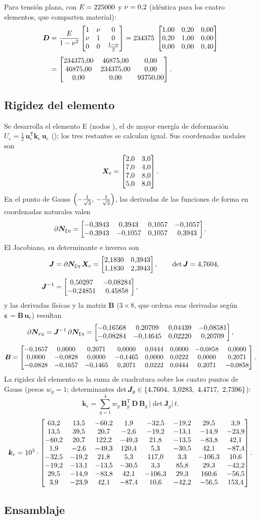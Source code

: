 Para tensión plana, con $E=\valE$ y $\nu=\valNu$ (idéntica para los cuatro elementos, que comparten material):
\begin{align*}
\bm{D}&=\frac{E}{1-\nu^{2}}
\begin{bmatrix} 1 & \nu & 0 \\ \nu & 1 & 0 \\ 0 & 0 & \tfrac{1-\nu}{2} \end{bmatrix}
=\valDfactor\;\DmatNorm \\[0.4em]
&=\Dmat .
\end{align*}

\subsection{Rigidez del elemento}

Se desarrolla el elemento E\showId{} (nodos \showNodes), el de mayor energía de deformación $U_e=\tfrac12\,\bm{u}_e^{\mathsf{T}}\bm{k}_e\,\bm{u}_e$ (\energiaInline); los tres restantes se calculan igual. Sus coordenadas nodales son
\[
\bm{X}_e=\Xemat .
\]
En el punto de Gauss $\gpA$, las derivadas de las funciones de forma en coordenadas naturales valen
\[
\partial\bm{N}_{\xi\eta}=\dNnatA .
\]
El Jacobiano, su determinante e inversa son
\begin{align*}
\bm{J}&=\partial\bm{N}_{\xi\eta}\,\bm{X}_e=\Jmata, \qquad
\det\bm{J}=\detJa, \\[0.4em]
\bm{J}^{-1}&=\invJa,
\end{align*}
y las derivadas físicas y la matriz $\bm{B}$ ($3\times 8$, que ordena esas derivadas según $\bm{\varepsilon}=\bm{B}\,\bm{u}_e$) resultan
\[
\partial\bm{N}_{xy}=\bm{J}^{-1}\,\partial\bm{N}_{\xi\eta}=\dNphysA ,
\]
{\footnotesize\setlength{\arraycolsep}{4pt}
\[
\bm{B}=\Bmata .
\]
}%
La rigidez del elemento es la suma de cuadratura sobre los cuatro puntos de Gauss (pesos $w_g=1$; determinantes $\det\bm{J}_g \in \{\detJinline\}$):
\[
\bm{k}_e=\sum_{g=1}^{4} w_g\,\bm{B}_g^{\mathsf{T}}\,\bm{D}\,\bm{B}_g\,\lvert\det\bm{J}_g\rvert\,t .
\]
{\footnotesize\setlength{\arraycolsep}{3.5pt}
\[
\bm{k}_e=\keScale\cdot\keMat .
\]
}%

\subsection{Ensamblaje}

